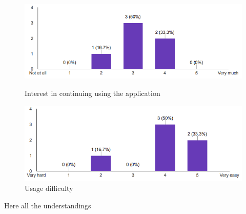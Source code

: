 \begin{figure}[!ht]
	\centering
	\begin{minipage}{.5\textwidth}
		\centering
		\includegraphics[scale=0.5]{Figures/responses/application_usage.png}
		\caption{Interest in continuing using the application}
		\label{fig:int_improving_lang}
	\end{minipage}%
	\begin{minipage}{.5\textwidth}
		\centering
		\includegraphics[scale=0.5]{Figures/responses/application_usage_difficulty.png}
		\caption{Usage difficulty}
		\label{fig:int_learnign_lang}
	\end{minipage}
\end{figure}

Here all the understandings

